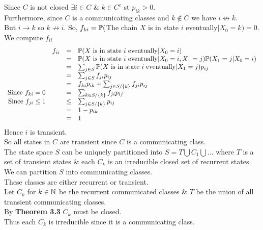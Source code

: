 \documentclass[11pt,a4paper]{article}
\begin{document}
Since $C$ is not closed $\exists i\in C$ \& $k\in C^c$ st $p_{ik}>0$.\\
Furthermore, since $C$ is a communicating classes and $k\not\in C$ we have $i\not\leftrightarrow k$.\\
But $i\to k$ so $k\not\to i$.
So, $f_{ki}=\mathbb{P}($The chain $X$ is in state $i$ eventually$| X_0=k)=0$.\\
We compute $f_{ii}$
\[\begin{array}{rrcl}
&f_{ii}&=&\prob(X\ \mathrm{is\ in\ state\ }i\mathrm{\ eventually}|X_0=i)\\
&&=&\prob(X\ \mathrm{is\ in\ state\ }i\mathrm{\ eventually}|X_0=i,X_1=j)\prob(X_1=j|X_0=i)\\
&&=&\sum_{j\in S}\prob(X\ \mathrm{is\ in\ state\ }i\mathrm{\ eventually}|X_1=j)p_{ij}\\
&&=&\sum_{j\in S}f_{ji}p_{ij}\\
&&=&f_{ki}p_{ik}+\sum_{j\in S/\{k\}}f_{ji}p_{ij}\\
\mathrm{Since\ }f_{ki}=0&&=&\sum_{k\in S/\{k\}}f_{ji}p_{ij}\\
\mathrm{Since\ }f_{ji}\leq1&&\leq&\sum_{j\in S/\{k\}}p_{ij}\\
&&=&1-p_{ik}\\
&&=&1
\end{array}\]
Hence $i$ is transient.\\
So all states in $C$ are transient since $C$ is a communicating class.\\

The state space $S$ can be uniquely partitioned into $S=T\bigcup C_1\bigcup\dots$ where $T$ is a set of transient states \& each $C_k$ is an irreducible closed set of recurrent states.\\

We can partition $S$ into communicating classes.\\
These classes are either recurrent or transient.\\
Let $C_k$ for $k\in\mathbb{N}$ be the recurrent communicated classes \& $T$ be the union of all transient communicating classes.\\
By \textbf{Theorem 3.3} $C_k$ must be closed.\\
Thus each $C_k$ is irreducible since it is a communicating class.\\
\end{document}
